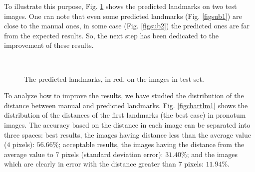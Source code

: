 \documentclass[review]{elsarticle}
\begin{document}
To illustrate this purpose, Fig. \ref{figrsexample} shows the predicted landmarks on two test images. One can note that even some predicted landmarks (Fig. \ref{figsub1}) are close to the manual ones, in some case (Fig. \ref{figsub2}) the predicted ones are far from the expected results. So, the next step has been dedicated to the improvement of these results.
\begin{figure}[htbp]
    \centering
    ~~
\\    
    \caption{The predicted landmarks, in red,  on the images in test set.}
    \label{figrsexample}
\end{figure}

To analyze how to improve the results, we have studied the distribution of the distance between manual and predicted landmarks. Fig. \ref{figchartlm1} shows the distribution of the distances of the first landmarks (the best case) in pronotum images. The accuracy based on the distance in each image can be
separated into three spaces: best results, the images having distance less
than the average value ($4$ pixels): $56.66\%$; acceptable results, the images having the
distance from the average value to $7$ pixels (standard deviation error): $31.40\%$; and the images which are clearly in error with the distance greater than $7$ pixels: $11.94\%$.
\end{document}
